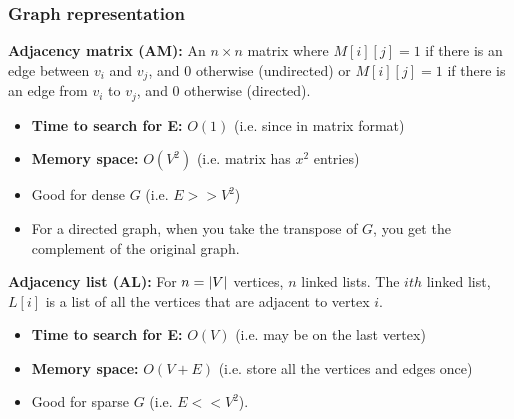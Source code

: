     \subsubsection{Graph representation}
    \begin{definition}
        
        \textbf{Adjacency matrix (AM):} An $n\times n$ matrix where $M[i][j]=1$ if there is an edge between $v_i$ and $v_j$, and $0$ otherwise (undirected) or $M[i][j]=1$ if there is an edge from $v_i$ to $v_j$, and $0$ otherwise (directed).
        \begin{itemize}
            \item \textbf{Time to search for E:} $O(1)$ (i.e. since in matrix format)
            \item \textbf{Memory space:} $O(V^2)$ (i.e. matrix has $x^2$ entries)
            \item Good for dense $G$ (i.e. $E>>V^2$)
            \item For a directed graph, when you take the transpose of $G$, you get the complement of the original graph.
        \end{itemize}
        \vspace{1em}

        \textbf{Adjacency list (AL):} For $n=\abs{V}$ vertices, $n$ linked lists. The $ith$ linked list, $L[i]$ is a list of all the vertices that are adjacent to vertex $i$.
        \begin{itemize}
            \item \textbf{Time to search for E:} $O(V)$ (i.e. may be on the last vertex)
            \item \textbf{Memory space:} $O(V+E)$ (i.e. store all the vertices and edges once)
            \item Good for sparse $G$ (i.e. $E<<V^2$).
        \end{itemize}
        \vspace{1em}
    \end{definition}

